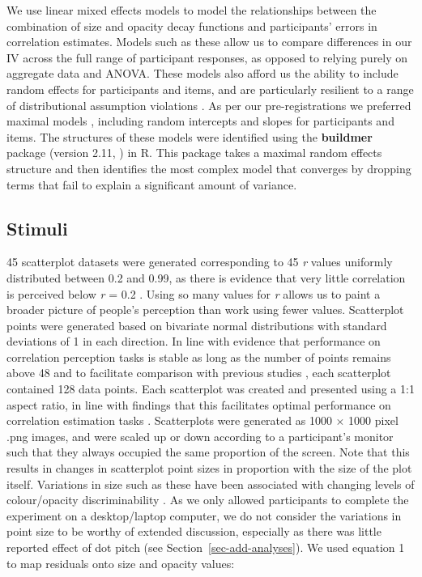 \documentclass[sigconf]{acmart}
\begin{document}
We use linear mixed effects models to model the relationships between
the combination of size and opacity decay functions and participants'
errors in correlation estimates. Models such as these allow us to
compare differences in our IV across the full range of participant
responses, as opposed to relying purely on aggregate data and ANOVA.
These models also afford us the ability to include random effects for
participants and items, and are particularly resilient to a range of
distributional assumption violations \citep{schielzeth_2020}. As per our
pre-registrations we preferred maximal models \citep{barr_2013},
including random intercepts and slopes for participants and items. The
structures of these models were identified using the \textbf{buildmer}
package (version 2.11, \citep{voeten_buildmer}) in R. This package takes
a maximal random effects structure and then identifies the most complex
model that converges by dropping terms that fail to explain a
significant amount of variance.

\hypertarget{sec-scatter-gen}{%
\subsection{Stimuli}\label{sec-scatter-gen}}

45 scatterplot datasets were generated corresponding to 45 \emph{r}
values uniformly distributed between 0.2 and 0.99, as there is evidence
that very little correlation is perceived below \emph{r} = 0.2
\citep{strahan_1978, bobko_1979, cleveland_1982}. Using so many values
for \emph{r} allows us to paint a broader picture of people's perception
than work using fewer values. Scatterplot points were generated based on
bivariate normal distributions with standard deviations of 1 in each
direction. In line with evidence that performance on correlation
perception tasks is stable as long as the number of points remains above
48 \citep{rensink_2014} and to facilitate comparison with previous
studies \citep{strain_2023, strain_2023b}, each scatterplot contained
128 data points. Each scatterplot was created and presented using a 1:1
aspect ratio, in line with findings that this facilitates optimal
performance on correlation estimation tasks \citep{micallef_2017}.
Scatterplots were generated as 1000 \(\times\) 1000 pixel .png images,
and were scaled up or down according to a participant's monitor such
that they always occupied the same proportion of the screen. Note that
this results in changes in scatterplot point sizes in proportion with
the size of the plot itself. Variations in size such as these have been
associated with changing levels of colour/opacity discriminability
\citep{szafir_2018, smart_2019}. As we only allowed participants to
complete the experiment on a desktop/laptop computer, we do not consider
the variations in point size to be worthy of extended discussion,
especially as there was little reported effect of dot pitch (see
Section~\ref{sec-add-analyses}). We used equation 1 to map residuals
onto size and opacity values:
\end{document}
